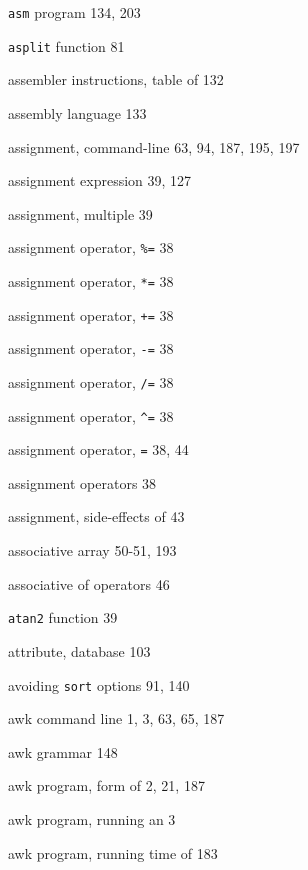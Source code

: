 \begin{multicols}{3}
\hangindent=3pc  \verb'asm' program 134, 203

\hangindent=3pc  \verb'asplit' function 81

\hangindent=3pc  assembler instructions, table of 132

\hangindent=3pc  assembly language 133

\hangindent=3pc  assignment, command-line 63, 94, 187, 195, 197

\hangindent=3pc  assignment expression 39, 127

\hangindent=3pc  assignment, multiple 39

\hangindent=3pc  assignment operator, \verb'%=' 38

\hangindent=3pc  assignment operator, \verb'*=' 38

\hangindent=3pc  assignment operator, \verb'+=' 38

\hangindent=3pc  assignment operator, \verb'-=' 38

\hangindent=3pc  assignment operator, \verb'/=' 38

\hangindent=3pc  assignment operator, \verb'^=' 38

\hangindent=3pc  assignment operator, \verb'=' 38, 44

\hangindent=3pc  assignment operators 38

\hangindent=3pc  assignment, side-effects of 43

\hangindent=3pc  associative array 50-51, 193

\hangindent=3pc  associative of operators 46

\hangindent=3pc  \verb'atan2' function 39

\hangindent=3pc  attribute, database 103

\hangindent=3pc  avoiding \verb'sort' options 91, 140

\hangindent=3pc  awk command line 1, 3, 63, 65, 187

\hangindent=3pc  awk grammar 148

\hangindent=3pc  awk program, form of 2, 21, 187

\hangindent=3pc  awk program, running an 3

\hangindent=3pc  awk program, running time of 183


\end{multicols}
